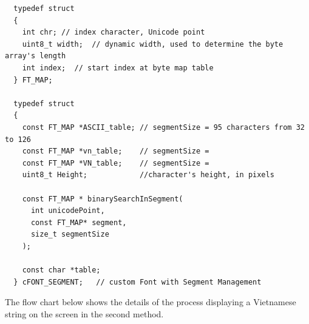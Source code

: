 \documentclass[../Main.tex]{subfiles}
\begin{document}
{\fontsize{8pt}{8pt}\selectfont 
    \begin{verbatim}
  typedef struct 
  {
    int chr; // index character, Unicode point
    uint8_t width;  // dynamic width, used to determine the byte array's length
    int index;  // start index at byte map table
  } FT_MAP;

  typedef struct
  {    
    const FT_MAP *ASCII_table; // segmentSize = 95 characters from 32 to 126
    const FT_MAP *vn_table;    // segmentSize = 
    const FT_MAP *VN_table;    // segmentSize = 
    uint8_t Height;            //character's height, in pixels
  
    const FT_MAP * binarySearchInSegment(
      int unicodePoint, 
      const FT_MAP* segment, 
      size_t segmentSize
    );
    
    const char *table;
  } cFONT_SEGMENT;   // custom Font with Segment Management
    \end{verbatim}
}

 The flow chart below shows the details of the process displaying a Vietnamese string on the screen in the second method.
\end{document}
